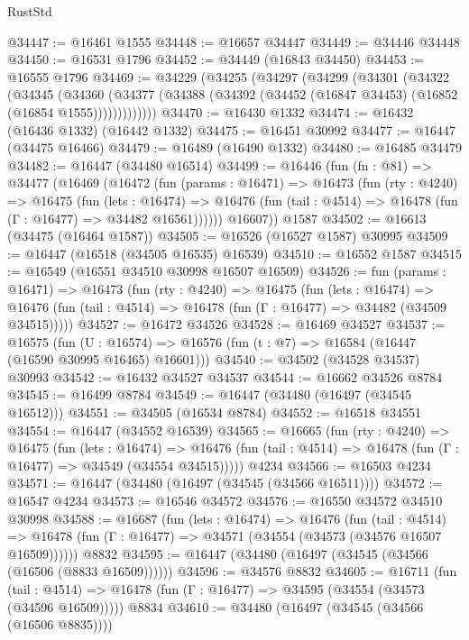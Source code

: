 \begin{lexlean}{RustStd}
\begin{coremodule}
{\begin{coremodule}
{{{{{{{{{{{{{{{{{{{{{{{{{{{{{{{{{{{{{{{{{{{{{{{{{{{{{{{@34447 := @16461 @1555
@34448 := @16657 @34447
@34449 := @34446 @34448
@34450 := @16531 @1796
@34452 := @34449 (@16843 @34450)
@34453 := @16555 @1796
@34469 := @34229
    (@34255
      (@34297
        (@34299
          (@34301
            (@34322
              (@34345
                (@34360
                  (@34377 (@34388 (@34392 (@34452 (@16847 @34453) (@16852 (@16854 @1555)))))))))))))
@34470 := @16430 @1332
@34474 := @16432 (@16436 @1332) (@16442 @1332)
@34475 := @16451 @30992
@34477 := @16447 (@34475 @16466)
@34479 := @16489 (@16490 @1332)
@34480 := @16485 @34479
@34482 := @16447 (@34480 @16514)
@34499 := @16446
    (fun (fn : @81) =>
    @34477
      (@16469
        (@16472
          (fun (params : @16471) =>
          @16473
            (fun (rty : @4240) =>
            @16475
              (fun (lets : @16474) =>
              @16476 (fun (tail : @4514) => @16478 (fun (Γ : @16477) => @34482 @16561))))))
        @16607))
    @1587
@34502 := @16613 (@34475 (@16464 @1587))
@34505 := @16526 (@16527 @1587) @30995
@34509 := @16447 (@16518 (@34505 @16535) @16539)
@34510 := @16552 @1587
@34515 := @16549 (@16551 @34510 @30998 @16507 @16509)
@34526 := fun (params : @16471) =>
  @16473
    (fun (rty : @4240) =>
    @16475
      (fun (lets : @16474) =>
      @16476 (fun (tail : @4514) => @16478 (fun (Γ : @16477) => @34482 (@34509 @34515)))))
@34527 := @16472 @34526
@34528 := @16469 @34527
@34537 := @16575
    (fun (U : @16574) => @16576 (fun (t : @7) => @16584 (@16447 (@16590 @30995 @16465) @16601)))
@34540 := @34502 (@34528 @34537) @30993
@34542 := @16432 @34527 @34537
@34544 := @16662 @34526 @8784
@34545 := @16499 @8784
@34549 := @16447 (@34480 (@16497 (@34545 @16512)))
@34551 := @34505 (@16534 @8784)
@34552 := @16518 @34551
@34554 := @16447 (@34552 @16539)
@34565 := @16665
    (fun (rty : @4240) =>
    @16475
      (fun (lets : @16474) =>
      @16476 (fun (tail : @4514) => @16478 (fun (Γ : @16477) => @34549 (@34554 @34515)))))
    @4234
@34566 := @16503 @4234
@34571 := @16447 (@34480 (@16497 (@34545 (@34566 @16511))))
@34572 := @16547 @4234
@34573 := @16546 @34572
@34576 := @16550 @34572 @34510 @30998
@34588 := @16687
    (fun (lets : @16474) =>
    @16476
      (fun (tail : @4514) =>
      @16478 (fun (Γ : @16477) => @34571 (@34554 (@34573 (@34576 @16507 @16509))))))
    @8832
@34595 := @16447 (@34480 (@16497 (@34545 (@34566 (@16506 (@8833 @16509))))))
@34596 := @34576 @8832
@34605 := @16711
    (fun (tail : @4514) => @16478 (fun (Γ : @16477) => @34595 (@34554 (@34573 (@34596 @16509)))))
    @8834
@34610 := @34480 (@16497 (@34545 (@34566 (@16506 @8835))))
}}}}}}}}}}}}}}}}}}}}}}}}}}}}}}}}}}}}}}}}}}}}}}}}}}}}}}}
\end{coremodule}}
\end{coremodule}
\end{lexlean}
